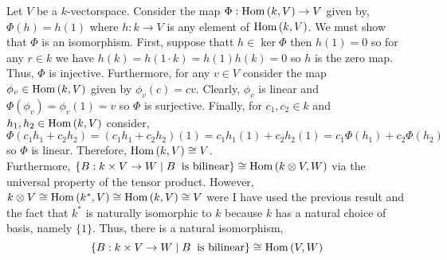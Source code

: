 \documentclass[12pt]{extarticle}
\begin{document}
Let $V$ be a $k$-vectorspace. Consider the map $\Phi : \mathrm{Hom}\left( k, V \right) \to V$ given by, $\Phi(h) = h(1)$ where $h : k \to V$ is any element of $\mathrm{Hom}\left( k, V \right)$. We must show that $\Phi$ is an isomorphism. First, suppose thatt $h \in \ker{\Phi}$ then $h(1) = 0$ so for any $r \in k$ we have $h(k) = h(1 \cdot k) = h(1) h(k) = 0$ so $h$ is the zero map. Thus, $\Phi$ is injective. Furthermore, for any $v \in V$ consider the map $\phi_v \in \mathrm{Hom}\left( k, V \right)$ given by $\phi_v(c) = cv$. Clearly, $\phi_v$ is linear and $\Phi(\phi_v) = \phi_v(1) = v$ so $\Phi$ is surjective. Finally, for $c_1, c_2 \in k$ and $h_1, h_2 \in \mathrm{Hom}\left( k, V \right)$ consider,
\[\Phi(c_1 h_1 + c_2 h_2) = (c_1 h_1 + c_2 h_2)(1) = c_1  h_1(1) + c_2 h_2(1) = c_1 \Phi(h_1) + c_2 \Phi(h_2) \]
so $\Phi$ is linear. Therefore, $\mathrm{Hom}\left( k, V \right) \cong V$.\bigskip\\
Furthermore, $\{ B : k \times V \to W \mid B \: \text{ is bilinear} \} \cong \mathrm{Hom}\left( k \otimes V, W \right)$ via the universal property of the tensor product. However, $k \otimes V \cong \mathrm{Hom}\left( k^*, V \right) \cong \mathrm{Hom}\left( k, V \right) \cong V$ were I have used the previous result and the fact that $k^*$ is naturally isomorphic to $k$ because $k$ has a natural choice of basis, namely $\{1\}$. Thus, there is a natural isomorphism,  
\[\{ B : k \times V \to W \mid B \: \text{ is bilinear} \} \cong \mathrm{Hom}\left( V, W \right)\]
\end{document}
